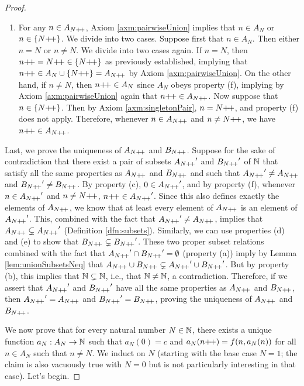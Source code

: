 \documentclass[../main.tex]{subfiles}
\begin{document}
\begin{enumerate}[ref={\thesection.\arabic*}]
\begin{proof}
\begin{enumerate}
            \item For any $n\in A_{N{+\!+}}$, Axiom \ref{axm:pairwiseUnion} implies that $n\in A_N$ or $n\in\{N{+\!+}\}$. We divide into two cases. Suppose first that $n\in A_N$. Then either $n=N$ or $n\neq N$. We divide into two cases again. If $n=N$, then $n{+\!+}=N{+\!+}\in\{N{+\!+}\}$ as previously established, implying that $n{+\!+}\in A_N\cup\{N{+\!+}\}=A_{N{+\!+}}$ by Axiom \ref{axm:pairwiseUnion}. On the other hand, if $n\neq N$, then $n{+\!+}\in A_N$ since $A_N$ obeys property (f), implying by Axiom \ref{axm:pairwiseUnion} again that $n{+\!+}\in A_{N{+\!+}}$. Now suppose that $n\in\{N{+\!+}\}$. Then by Axiom \ref{axm:singletonPair}, $n=N{+\!+}$, and property (f) does not apply. Therefore, whenever $n\in A_{N{+\!+}}$ and $n\neq N{+\!+}$, we have $n{+\!+}\in A_{N{+\!+}}$.
        \end{enumerate}
        Last, we prove the uniqueness of $A_{N{+\!+}}$ and $B_{N{+\!+}}$. Suppose for the sake of contradiction that there exist a pair of subsets ${A_{N{+\!+}}}'$ and ${B_{N{+\!+}}}'$ of $\mathbb{N}$ that satisfy all the same properties as $A_{N{+\!+}}$ and $B_{N{+\!+}}$ and such that ${A_{N{+\!+}}}'\neq A_{N{+\!+}}$ and ${B_{N{+\!+}}}'\neq B_{N{+\!+}}$. By property (c), $0\in{A_{N{+\!+}}}'$, and by property (f), whenever $n\in{A_{N{+\!+}}}'$ and $n\neq N{+\!+}$, $n{+\!+}\in{A_{N{+\!+}}}'$. Since this also defines exactly the elements of $A_{N{+\!+}}$, we know that at least every element of $A_{N{+\!+}}$ is an element of ${A_{N{+\!+}}}'$. This, combined with the fact that ${A_{N{+\!+}}}'\neq A_{N{+\!+}}$, implies that $A_{N{+\!+}}\subsetneq{A_{N{+\!+}}}'$ (Definition \ref{dfn:subsets}). Similarly, we can use properties (d) and (e) to show that $B_{N{+\!+}}\subsetneq{B_{N{+\!+}}}'$. These two proper subset relations combined with the fact that ${A_{N{+\!+}}}'\cap{B_{N{+\!+}}}'=\emptyset$ (property (a)) imply by Lemma \ref{lem:unionSubsetsNeq} that $A_{N{+\!+}}\cup B_{N{+\!+}}\subsetneq{A_{N{+\!+}}}'\cup{B_{N{+\!+}}}'$. But by property (b), this implies that $\mathbb{N}\subsetneq\mathbb{N}$, i.e., that $\mathbb{N}\neq\mathbb{N}$, a contradiction. Therefore, if we assert that ${A_{N{+\!+}}}'$ and ${B_{N{+\!+}}}'$ have all the same properties as $A_{N{+\!+}}$ and $B_{N{+\!+}}$, then ${A_{N{+\!+}}}'=A_{N{+\!+}}$ and ${B_{N{+\!+}}}'=B_{N{+\!+}}$, proving the uniqueness of $A_{N{+\!+}}$ and $B_{N{+\!+}}$.\par
        We now prove that for every natural number $N\in\mathbb{N}$, there exists a unique function $a_N:A_N\to\mathbb{N}$ such that $a_N(0)=c$ and $a_N(n{+\!+})=f(n,a_N(n))$ for all $n\in A_N$ such that $n\neq N$. We induct on $N$ (starting with the base case $N=1$; the claim is also vacuously true with $N=0$ but is not particularly interesting in that case). Let's begin.\par

\end{proof}
\end{enumerate}
\end{document}
